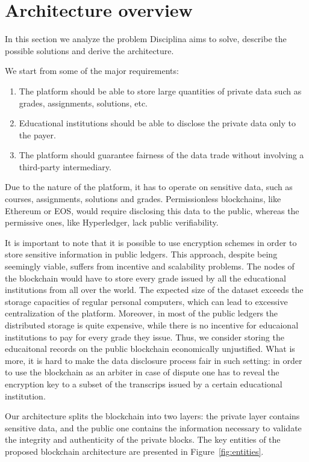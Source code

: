 \section{Architecture overview}
\label{sec:architecture}

In this section we analyze the problem Disciplina aims to solve, describe the possible solutions and derive the architecture.

We start from some of the major requirements:

\begin{enumerate}
\item The platform should be able to store large quantities of private data such as grades, assignments, solutions, etc.
\item Educational institutions should be able to disclose the private data only to the payer.
\item The platform should guarantee fairness of the data trade without involving a third-party intermediary.
\end{enumerate}

Due to the nature of the platform, it has to operate on sensitive data, such as
courses, assignments, solutions and grades. Permissionless blockchains, like
Ethereum or EOS, would require disclosing this data to the public, whereas the
permissive ones, like Hyperledger, lack public verifiability.

It is important to note that it is possible to use encryption schemes in order to store sensitive information in public ledgers. This approach, despite being seemingly viable, suffers from incentive and scalability problems. The nodes of the blockchain would have to store every grade issued by all the educational institutions from all over the world. The expected size of the dataset exceeds the storage capacities of regular personal computers, which can lead to excessive centralization of the platform. Moreover, in most of the public ledgers the distributed storage is quite expensive, while there is no incentive for educaional institutions to pay for every grade they issue. Thus, we consider storing the educaitonal records on the public blockchain economically unjustified. What is more, it is hard to make the data disclosure process fair in such setting: in order to use the blockchain as an arbiter in case of dispute one has to reveal the encryption key to a subset of the transcrips issued by a certain educational institution.

Our architecture splits the blockchain into two layers: the private layer
contains sensitive data, and the public one contains the information necessary
to validate the integrity and authenticity of the private blocks. The key
entities of the proposed blockchain architecture are presented in
Figure~\ref{fig:entities}.

